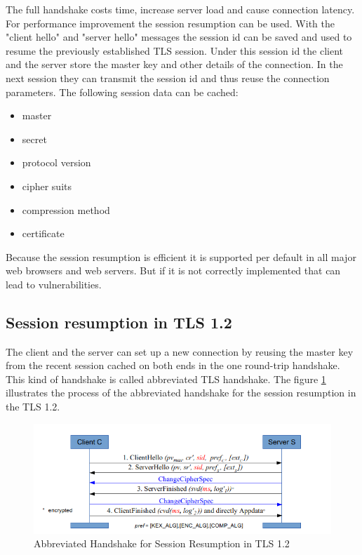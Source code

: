 The full handshake costs time, increase server load and cause connection latency. For performance improvement the session resumption can be used. With the "client hello" and "server hello" messages the session id can be saved and used to resume the previously established TLS session. Under this session id the client and the server store the master key and other details of the connection. In the next session they can transmit the session id and thus reuse the connection parameters. The following session data can be cached:
\begin{itemize}
\item master 
\item secret
\item protocol version
\item cipher suits
\item compression method
\item certificate
\end{itemize}
Because the session resumption is efficient it is supported per default in all major web browsers and web servers. But if it is not correctly implemented that can lead to vulnerabilities.

\subsection{Session resumption in TLS 1.2}
\label{subsec:resumption1_2}

The client and the server can set up a new connection by reusing the master key from the recent session cached on both ends in the one round-trip handshake. This kind of handshake is called abbreviated TLS handshake. The figure \ref{fig:resumption1_2} illustrates the process of the abbreviated handshake for the session resumption in the TLS 1.2.

\begin{figure}[H]
	\centering
		\includegraphics[scale=0.85]{images/resumption1_2.png}
	\caption{Abbreviated Handshake for Session Resumption in TLS 1.2 \cite{Hassenstein}}
	\label{fig:resumption1_2}
\end{figure}

